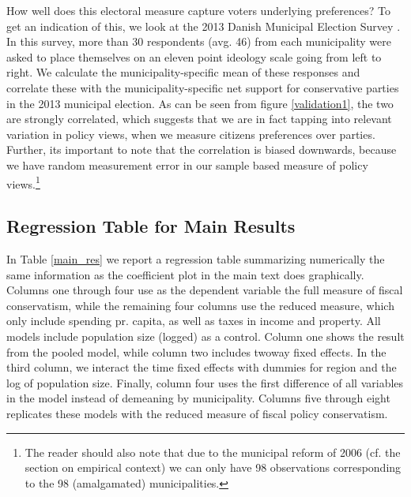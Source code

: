 \documentclass[a4paper,12pt]{article}
\begin{document}
How well does this electoral measure capture voters underlying preferences? To get an indication of this, we look at the 2013 Danish Municipal Election Survey \cite{elklit2017kv13}. In this survey, more than 30 respondents (avg. 46) from each municipality were asked to place themselves on an eleven point ideology scale going from left to right. We calculate the municipality-specific mean of these responses and correlate these with the municipality-specific net support for conservative parties in the 2013 municipal election.  As can be seen from figure \ref{validation1}, the two are strongly correlated, which suggests that we are in fact tapping into relevant variation in policy views, when we measure citizens preferences over parties. Further, its important to note that the correlation is biased downwards, because we have random measurement error in our sample based measure of policy views.\footnote{The reader should also note that due to the municipal reform of 2006 (cf. the section on empirical context) we can only have 98 observations corresponding to the 98 (amalgamated) municipalities.}

\clearpage

\subsection{Regression Table for Main Results}

In Table \ref{main_res} we report a regression table summarizing  numerically the same information as the coefficient plot in the main text does graphically. Columns one through four use as the dependent variable the full measure of fiscal conservatism, while the remaining four columns use the reduced measure, which only include spending pr. capita, as well as taxes in income and property. All models include population size (logged) as a control. Column one shows the result from the pooled model, while column two includes twoway fixed effects. In the third column, we interact the time fixed effects with dummies for region and the log of population size. Finally, column four uses the first difference of all variables in the model instead of demeaning by municipality. Columns five through eight replicates these models with the reduced measure of fiscal policy conservatism. 
\end{document}
